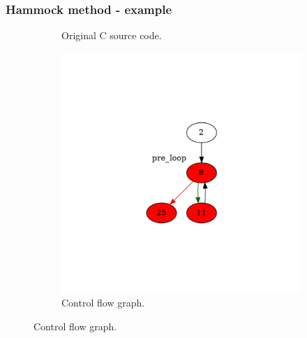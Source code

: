 \documentclass[aspectratio=1610]{beamer}
\begin{document}
\begin{frame}
	\frametitle{Hammock method - example}
	\begin{figure}[htbp]
		\centering
		\begin{subfigure}[b]{0.30\textwidth}
			\centering
			
			\caption{Original C source code.}
		\end{subfigure}
		\begin{subfigure}[b]{0.50\textwidth}
			\centering
			\includegraphics[height=0.6\paperheight]{inc/methods/hammock/example/without-break/main_0003a.png}
			\caption{Control flow graph.}
		\end{subfigure}
	\end{figure}
\end{frame}
\end{document}
